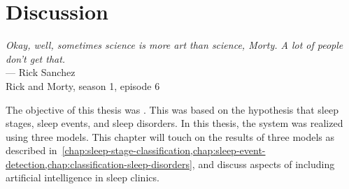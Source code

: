 \chapter{Discussion}\label{chap:discussion}
\begin{flushright}{\slshape 
        Okay, well, sometimes science is more art than science, Morty. A lot of people don't get that.} \\ \medskip
        --- Rick Sanchez\\Rick and Morty, season 1, episode 6
\end{flushright}

\vspace{6cm}

The objective of this thesis was \objective.
This was based on the hypothesis that \MakeLowercase{\hypothesis} sleep stages, sleep events, and sleep disorders.
In this thesis, the system was realized using three models.
This chapter will touch on the results of three models as described in~\cref{chap:sleep-stage-classification,chap:sleep-event-detection,chap:classification-sleep-disorders}, and discuss aspects of including artificial intelligence in sleep clinics.

